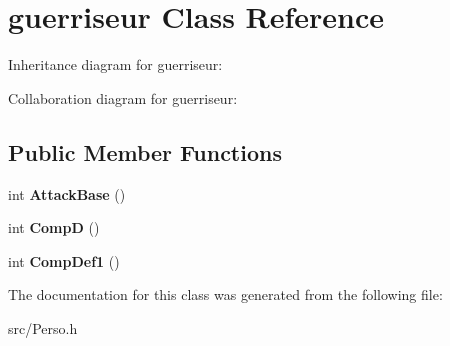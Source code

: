 \hypertarget{classguerriseur}{}\section{guerriseur Class Reference}
\label{classguerriseur}


Inheritance diagram for guerriseur\+:


Collaboration diagram for guerriseur\+:
\subsection*{Public Member Functions}
\begin{DoxyCompactItemize}
\item 
int {\bfseries Attack\+Base} ()\hypertarget{classguerriseur_a4a726a53f8da0576628ea68820c51a5d}{}\label{classguerriseur_a4a726a53f8da0576628ea68820c51a5d}

\item 
int {\bfseries CompD} ()\hypertarget{classguerriseur_af08e160418e6e6eaa46f135122bb0100}{}\label{classguerriseur_af08e160418e6e6eaa46f135122bb0100}

\item 
int {\bfseries Comp\+Def1} ()\hypertarget{classguerriseur_a86d4ab840da8e19f4af28c2159b985d9}{}\label{classguerriseur_a86d4ab840da8e19f4af28c2159b985d9}

\end{DoxyCompactItemize}


The documentation for this class was generated from the following file\+:\begin{DoxyCompactItemize}
\item 
src/Perso.\+h\end{DoxyCompactItemize}
